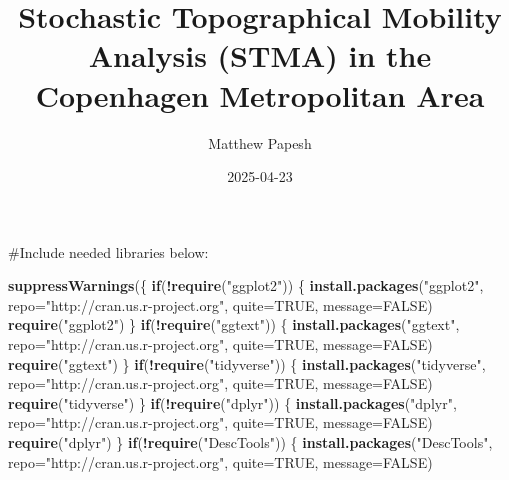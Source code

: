 \documentclass[
]{article}
\title{Stochastic Topographical Mobility Analysis (STMA) in the
Copenhagen Metropolitan Area}
\author{Matthew Papesh}
\date{2025-04-23}
\newenvironment{Shaded}{\begin{snugshade}}{\end{snugshade}}
\newcommand{\AttributeTok}[1]{\textcolor[rgb]{0.13,0.29,0.53}{#1}}
\newcommand{\ConstantTok}[1]{\textcolor[rgb]{0.56,0.35,0.01}{#1}}
\newcommand{\ControlFlowTok}[1]{\textcolor[rgb]{0.13,0.29,0.53}{\textbf{#1}}}
\newcommand{\FunctionTok}[1]{\textcolor[rgb]{0.13,0.29,0.53}{\textbf{#1}}}
\newcommand{\NormalTok}[1]{#1}
\newcommand{\SpecialCharTok}[1]{\textcolor[rgb]{0.81,0.36,0.00}{\textbf{#1}}}
\newcommand{\StringTok}[1]{\textcolor[rgb]{0.31,0.60,0.02}{#1}}
\begin{document}
\maketitle

\#Include needed libraries below:

\begin{Shaded}
\begin{Highlighting}[]
\FunctionTok{suppressWarnings}\NormalTok{(\{}
 \ControlFlowTok{if}\NormalTok{(}\SpecialCharTok{!}\FunctionTok{require}\NormalTok{(}\StringTok{"ggplot2"}\NormalTok{)) \{}
 \FunctionTok{install.packages}\NormalTok{(}\StringTok{"ggplot2"}\NormalTok{, }\AttributeTok{repo=}\StringTok{"http://cran.us.r{-}project.org"}\NormalTok{, }\AttributeTok{quite=}\ConstantTok{TRUE}\NormalTok{, }\AttributeTok{message=}\ConstantTok{FALSE}\NormalTok{)}
 \FunctionTok{require}\NormalTok{(}\StringTok{"ggplot2"}\NormalTok{)}
\NormalTok{ \}}
 \ControlFlowTok{if}\NormalTok{(}\SpecialCharTok{!}\FunctionTok{require}\NormalTok{(}\StringTok{"ggtext"}\NormalTok{)) \{}
 \FunctionTok{install.packages}\NormalTok{(}\StringTok{"ggtext"}\NormalTok{, }\AttributeTok{repo=}\StringTok{"http://cran.us.r{-}project.org"}\NormalTok{, }\AttributeTok{quite=}\ConstantTok{TRUE}\NormalTok{, }\AttributeTok{message=}\ConstantTok{FALSE}\NormalTok{)}
 \FunctionTok{require}\NormalTok{(}\StringTok{"ggtext"}\NormalTok{)}
\NormalTok{ \}}
 \ControlFlowTok{if}\NormalTok{(}\SpecialCharTok{!}\FunctionTok{require}\NormalTok{(}\StringTok{"tidyverse"}\NormalTok{)) \{}
 \FunctionTok{install.packages}\NormalTok{(}\StringTok{"tidyverse"}\NormalTok{, }\AttributeTok{repo=}\StringTok{"http://cran.us.r{-}project.org"}\NormalTok{, }\AttributeTok{quite=}\ConstantTok{TRUE}\NormalTok{, }\AttributeTok{message=}\ConstantTok{FALSE}\NormalTok{)}
 \FunctionTok{require}\NormalTok{(}\StringTok{"tidyverse"}\NormalTok{)}
\NormalTok{ \}}
 \ControlFlowTok{if}\NormalTok{(}\SpecialCharTok{!}\FunctionTok{require}\NormalTok{(}\StringTok{"dplyr"}\NormalTok{)) \{ }
 \FunctionTok{install.packages}\NormalTok{(}\StringTok{"dplyr"}\NormalTok{, }\AttributeTok{repo=}\StringTok{"http://cran.us.r{-}project.org"}\NormalTok{, }\AttributeTok{quite=}\ConstantTok{TRUE}\NormalTok{, }\AttributeTok{message=}\ConstantTok{FALSE}\NormalTok{)}
 \FunctionTok{require}\NormalTok{(}\StringTok{"dplyr"}\NormalTok{)}
\NormalTok{ \}}
 \ControlFlowTok{if}\NormalTok{(}\SpecialCharTok{!}\FunctionTok{require}\NormalTok{(}\StringTok{"DescTools"}\NormalTok{)) \{}
 \FunctionTok{install.packages}\NormalTok{(}\StringTok{"DescTools"}\NormalTok{, }\AttributeTok{repo=}\StringTok{"http://cran.us.r{-}project.org"}\NormalTok{, }\AttributeTok{quite=}\ConstantTok{TRUE}\NormalTok{, }\AttributeTok{message=}\ConstantTok{FALSE}\NormalTok{)}

\end{Highlighting}
\end{Shaded}
\end{document}
